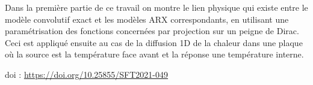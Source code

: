{Dans la première partie de ce travail on montre le lien physique qui existe entre le modèle convolutif exact et les modèles ARX correspondants, en utilisant une paramétrisation des fonctions concernées par projection sur un peigne de Dirac. Ceci est appliqué ensuite au cas de la diffusion 1D de la chaleur dans une plaque où la source est la température face avant et la réponse une température interne.



 \vfill doi : \url{https://doi.org/10.25855/SFT2021-049}

}
 
